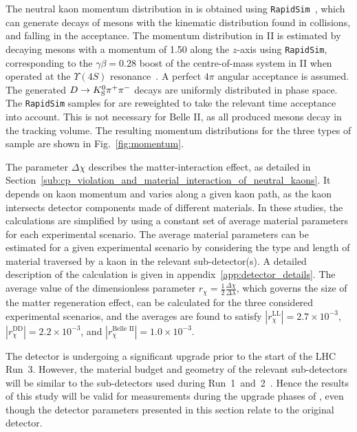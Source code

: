 The neutral kaon momentum distribution in \lhcb is obtained using \texttt{RapidSim}~\cite{RapidSim}, which can generate decays of \B mesons with the kinematic distribution found in \lhcb collisions, and falling in the \lhcb acceptance. The momentum distribution in \belle II is estimated by decaying \B mesons  with a momentum of 1.50 \gevc along the $z$-axis using \texttt{RapidSim}, corresponding to the $\gamma\beta=0.28$ boost of the centre-of-mass system in \belle II when operated at the $\Upsilon(4S)$ resonance~\cite{BELLE2-PUB-2018-001}. A perfect $4\pi$ angular acceptance is assumed. The generated ${D}\rightarrow{\ensuremath{{K}^0_{\mathrm{S}}}}\pi^+\pi^-$ decays are uniformly distributed in phase space. The \texttt{RapidSim} samples for \lhcb are reweighted to take the relevant time acceptance into account. This is not necessary for Belle II, as all produced \KS mesons decay in the tracking volume. 
The resulting momentum distributions for the three types of sample are shown in Fig.~\ref{fig:momentum}. 


The parameter $\Delta\chi$ describes the matter-interaction effect, as detailed in Section~\ref{sub:cp_violation_and_material_interaction_of_neutral_kaons}. It depends on kaon momentum and varies along a given kaon path, as the kaon intersects detector components made of different materials. In these studies, the calculations are simplified by using a constant set of average material parameters for each experimental scenario. The average material parameters can be estimated for a given experimental scenario by considering the type and length of material traversed by a kaon in the relevant sub-detector(s). A detailed description of the calculation is given in appendix~\ref{app:detector_details}. The average value of the dimensionless parameter $r_\chi=\frac{1}{2}\frac{\Delta\chi}{\Delta\lambda}$, which governs the size of the matter regeneration effect, can be calculated for the three considered experimental scenarios, and the averages are found to satisfy $|r_\chi^\text{LL}|=2.7\times10^{-3}$, $|r_\chi^\text{DD}|=2.2\times10^{-3}$, and ${|r_\chi^\text{Belle II}|=1.0\times10^{-3}}$. 

The \lhcb detector is undergoing a significant upgrade prior to the start of the LHC Run~3. However, the material budget and geometry of the relevant sub-detectors will be similar to the sub-detectors used during Run~1~and~2~\cite{VELOUpgradeTDR,PIDUpgradeTDR}. Hence the results of this study will be valid for measurements during the upgrade phases of \lhcb, even though the detector parameters presented in this section relate to the original \lhcb detector.



